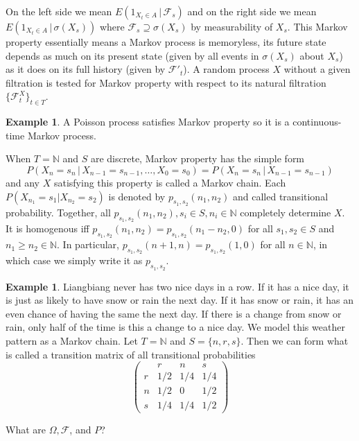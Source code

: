 \documentclass[12pt]{amsart}
\theoremstyle{definition}
\newtheorem{example}[theorem]{Example}
\begin{document}
On the left side we mean $E(1_{X_t \in A} \,|\, \mathcal{F}_s)$ and on the right side we mean $E(1_{X_t \in A} \,|\, \sigma(X_s))$ where $\mathcal{F}_s \supseteq \sigma(X_s)$ by measurability of $X_s$. This Markov property essentially means a Markov process is memoryless, its future state depends as much on its present state (given by all events in $\sigma(X_s)$ about $X_s$) as it does on its full history (given by $\mathcal{F}'_t$). A random process $X$ without a given filtration is tested for Markov property with respect to its natural filtration $\{\mathcal{F}_t^X\}_{t \in T}$.

\begin{example} A Poisson process satisfies Markov property so it is a continuous-time Markov process.
\end{example}

When $T = \mathbb{N}$ and $S$ are discrete, Markov property has the simple form
$$P(X_n = s_n \,|\, X_{n-1} = s_{n-1}, \dots , X_0 = s_0) = P(X_n = s_n \,|\, X_{n-1} = s_{n-1})$$
and any $X$ satisfying this property is called a Markov chain. Each $P(X_{n_1} = s_1 | X_{n_2} = s_2)$ is denoted by $p_{s_1,s_2}(n_1,n_2)$ and called transitional probability. Together, all $p_{s_1,s_2}(n_1,n_2), s_i \in S, n_i \in \mathbb{N}$ completely determine $X$. It is homogenous iff $p_{s_1, s_2}(n_1, n_2) = p_{s_1,s_2}(n_1 - n_2, 0)$ for all $s_1, s_2 \in S$ and $n_1 \geq n_2 \in \mathbb{N}$. In particular, $p_{s_1, s_2}(n+1, n) = p_{s_1,s_2}(1, 0)$ for all $n \in \mathbb{N}$, in which case we simply write it as $p_{s_1,s_2}$.

\begin{example} Liangbiang never has two nice days in a row. If it has a nice day, it is just as likely to have snow or rain the next day. If it has snow or rain, it has an even chance of having the same the next day. If there is a change from snow or rain, only half of the time is this a change to a nice day. We model this weather pattern as a Markov chain. Let $T = \mathbb{N}$ and $S = \{n, r, s\}$. Then we can form what is called a transition matrix of all transitional probabilities
$$\left(\begin{array}{cccc} & r & n & s \\ r & 1/2 & 1/4 & 1/4 \\ n & 1/2 & 0 & 1/2 \\ s & 1/4 & 1/4 & 1/2 \end{array}\right)$$

What are $\Omega, \mathcal{F}$, and $P$?
\end{example}
\end{document}
